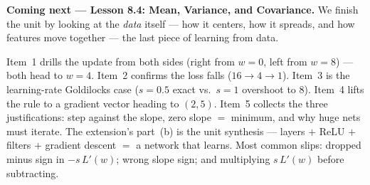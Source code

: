\documentclass[10pt]{article}
\begin{document}
\begin{spiralbox}
\textbf{Coming next --- Lesson 8.4: Mean, Variance, and Covariance.} We finish the unit by looking at the
\emph{data} itself --- how it centers, how it spreads, and how features move together --- the last piece of
learning from data.
\end{spiralbox}

\begin{teachernote}
Item~1 drills the update from both sides (right from $w=0$, left from $w=8$) --- both head to $w=4$. Item~2
confirms the loss falls ($16\to4\to1$). Item~3 is the learning-rate Goldilocks case ($s=0.5$ exact vs.\ $s=1$
overshoot to $8$). Item~4 lifts the rule to a gradient vector heading to $(2,5)$. Item~5 collects the three
justifications: step against the slope, zero slope $=$ minimum, and why huge nets must iterate. The extension's
part~(b) is the unit synthesis --- layers $+$ ReLU $+$ filters $+$ gradient descent $=$ a network that learns.
Most common slips: dropped minus sign in $-s\,L'(w)$; wrong slope sign; and multiplying $s\,L'(w)$ before
subtracting.
\end{teachernote}
\end{document}
